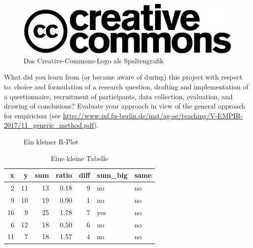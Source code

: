 \documentclass[de]{agse-empir-report}\usepackage[]{graphicx}\usepackage[]{color}
\makeatletter
\newenvironment{kframe}{%
 \def\at@end@of@kframe{}%
 \ifinner\ifhmode%
  \def\at@end@of@kframe{\end{minipage}}%
  \begin{minipage}{\columnwidth}%
 \fi\fi%
 \def\FrameCommand##1{\hskip\@totalleftmargin \hskip-\fboxsep
 \colorbox{shadecolor}{##1}\hskip-\fboxsep
     \hskip-\linewidth \hskip-\@totalleftmargin \hskip\columnwidth}%
 \MakeFramed {\advance\hsize-\width
   \@totalleftmargin\z@ \linewidth\hsize
   \@setminipage}}%
 {\par\unskip\endMakeFramed%
 \at@end@of@kframe}
\newenvironment{knitrout}{}{} %
\makeatother
\begin{document}
\begin{figure}
    \includegraphics[width=\linewidth]{creative_commons.jpg}
    \caption{Das Creative-Commons-Logo als Spaltengrafik}
\end{figure}

What did you learn from (or became aware of during) this project with
respect to: choice and formulation of a research question,
drafting and implementation of a questionnaire,
recruitment of participants,
data collection, evaluation, and drawing of conclusions?
Evaluate your approach in view of the general approach for
empiricism (see
\url{http://www.inf.fu-berlin.de/inst/ag-se/teaching/V-EMPIR-2017/11_generic_method.pdf}).

\lipsum[11-13]

\begin{figure}
\begin{knitrout}
\color{fgcolor}\begin{kframe}


{\ttfamily\noindent\bfseries{}}

{\ttfamily\noindent\bfseries{}}

{\ttfamily\noindent\bfseries\color{errorcolor}{\#\# Error in print(plt): Objekt 'plt' nicht gefunden}}\end{kframe}
\end{knitrout}
    \caption{Ein kleiner R-Plot}
\end{figure}

\begin{table}
    \centering
\begin{knitrout}
\color{fgcolor}
\begin{tabular}{rrrrrll}
\toprule
x & y & sum & ratio & diff & sum\_big & same\\
\midrule
2 & 11 & 13 & 0.18 & 9 & no & no\\
9 & 10 & 19 & 0.90 & 1 & no & no\\
16 & 9 & 25 & 1.78 & 7 & yes & no\\
6 & 12 & 18 & 0.50 & 6 & no & no\\
11 & 7 & 18 & 1.57 & 4 & no & no\\
\bottomrule
\end{tabular}


\end{knitrout}
    \caption{Eine kleine Tabelle}
\end{table}
\end{document}
